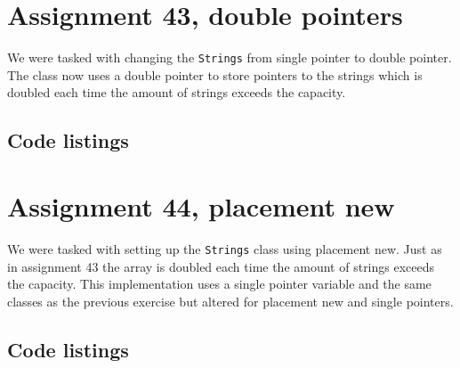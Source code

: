 \documentclass[11pt]{article}
\begin{document}



\section*{Assignment 43, double pointers}
We were tasked with changing the \texttt{Strings} from single pointer to double pointer.
The class now uses a double pointer to store pointers to the strings which is doubled each time the amount of strings exceeds the capacity.

\subsection*{Code listings}










\section*{Assignment 44, placement new}
We were tasked with setting up the \texttt{Strings} class using placement new.
Just as in assignment 43 the array is doubled each time the amount of strings exceeds the capacity.
This implementation uses a single pointer variable and the same classes as the previous exercise but altered for placement new and single pointers.

\subsection*{Code listings}









\end{document}
